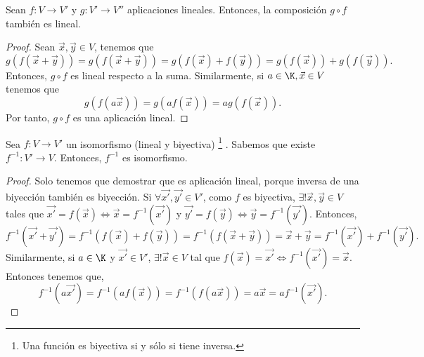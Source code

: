 \begin{fprop}[]
\normalfont Sean $\displaystyle f: V \to V' $ y $\displaystyle g: V' \to V '' $ aplicaciones lineales. Entonces, la composición $\displaystyle g \circ f $ también es lineal. 
\end{fprop}

\begin{proof}
Sean $\displaystyle \vec{x}, \vec{y} \in V $, tenemos que  
\[ g \left( f \left(\vec{x}+\vec{y}\right)\right) = g \left(f\left(\vec{x}+\vec{y}\right)\right) = g\left(f\left(\vec{x}\right) + f\left(\vec{y}\right)\right) = g\left(f\left(\vec{x}\right)\right) + g\left(f\left(\vec{y}\right)\right) .\]
Entonces, $\displaystyle g \circ f $ es lineal respecto a la suma. Similarmente, si $\displaystyle a \in \K, \vec{x} \in V $ tenemos que
\[ g\left(f\left(a\vec{x}\right)\right) = g\left(af\left(\vec{x}\right)\right) = ag\left(f\left(\vec{x}\right)\right) .\]
Por tanto, $\displaystyle g\circ f $ es una aplicación lineal. 
\end{proof}

\begin{fprop}[]
\normalfont Sea $\displaystyle f: V \to V' $ un isomorfismo (lineal y biyectiva) \footnote{Una función es biyectiva si y sólo si tiene inversa.} . Sabemos que existe $\displaystyle f^{-1}:V'\to V $. Entonces, $\displaystyle f^{-1} $ es isomorfismo.
\end{fprop}

\begin{proof}
Solo tenemos que demostrar que es aplicación lineal, porque inversa de una biyección también es biyección. Si $\displaystyle \forall \vec{x'}, \vec{y'} \in V' $, como $\displaystyle f $ es biyectiva, $\displaystyle \exists! \vec{x}, \vec{y} \in V $ tales que $\displaystyle \vec{x'} = f\left(\vec{x}\right) \iff \vec{x} = f^{-1}\left(\vec{x'}\right) $ y $\displaystyle \vec{y'} = f\left(\vec{y}\right) \iff \vec{y} = f^{-1}\left(\vec{y'}\right) $. Entonces, 
\[f^{-1}\left(\vec{x'} + \vec{y'}\right) = f^{-1}\left(f\left(\vec{x}\right)+f\left(\vec{y}\right)\right) = f^{-1}\left(f\left(\vec{x}+\vec{y}\right)\right) = \vec{x}+\vec{y} = f^{-1}\left(\vec{x'}\right) + f^{-1}\left(\vec{y'}\right) .\]
Similarmente, si $\displaystyle a \in \K $ y $\displaystyle \vec{x'}\in V' $, $\displaystyle \exists! \vec{x} \in V $ tal que $\displaystyle f\left(\vec{x}\right) = \vec{x'} \iff f^{-1}\left(\vec{x'}\right) = \vec{x}$. Entonces tenemos que, 
\[f^{-1}\left(a\vec{x'}\right) = f^{-1}\left(af\left(\vec{x}\right)\right) = f^{-1}\left(f\left(a\vec{x}\right)\right) = a\vec{x} = a f^{-1}\left(\vec{x'}\right) .\]
\end{proof}

